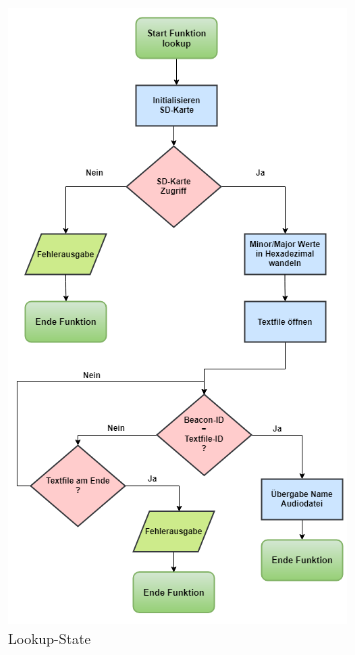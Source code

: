 \begin{figure}[htbp]
	\centering
	\includegraphics[width=0.8\textwidth]{Data/lookup_picture}
	\caption[Statemachine: lookup]{Lookup-State}
	\label{fig:lookupState}
\end{figure} 